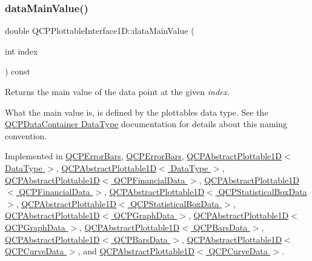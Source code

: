\subsubsection{\texorpdfstring{data\+Main\+Value()}{dataMainValue()}}
{\footnotesize\ttfamily double Q\+C\+P\+Plottable\+Interface1\+D\+::data\+Main\+Value (\begin{DoxyParamCaption}\item[{int}]{index }\end{DoxyParamCaption}) const\hspace{0.3cm}{\ttfamily [pure virtual]}}

Returns the main value of the data point at the given {\itshape index}.

What the main value is, is defined by the plottable\textquotesingle{}s data type. See the \hyperlink{class_q_c_p_data_container_qcpdatacontainer-datatype}{Q\+C\+P\+Data\+Container Data\+Type} documentation for details about this naming convention. 

Implemented in \hyperlink{class_q_c_p_error_bars_a88cd90280366b44c2159774bfb7c473a}{Q\+C\+P\+Error\+Bars}, \hyperlink{class_q_c_p_error_bars_a30170b7bdbfd649e0dd7f79f9a6e62ff}{Q\+C\+P\+Error\+Bars}, \hyperlink{class_q_c_p_abstract_plottable1_d_a0f913bb0889ca7cb574657a078fc8cff}{Q\+C\+P\+Abstract\+Plottable1\+D$<$ Data\+Type $>$}, \hyperlink{class_q_c_p_abstract_plottable1_d_a104b2e36cf4d4ea29f7247887a193842}{Q\+C\+P\+Abstract\+Plottable1\+D$<$ Data\+Type $>$}, \hyperlink{class_q_c_p_abstract_plottable1_d_a0f913bb0889ca7cb574657a078fc8cff}{Q\+C\+P\+Abstract\+Plottable1\+D$<$ Q\+C\+P\+Financial\+Data $>$}, \hyperlink{class_q_c_p_abstract_plottable1_d_a104b2e36cf4d4ea29f7247887a193842}{Q\+C\+P\+Abstract\+Plottable1\+D$<$ Q\+C\+P\+Financial\+Data $>$}, \hyperlink{class_q_c_p_abstract_plottable1_d_a0f913bb0889ca7cb574657a078fc8cff}{Q\+C\+P\+Abstract\+Plottable1\+D$<$ Q\+C\+P\+Statistical\+Box\+Data $>$}, \hyperlink{class_q_c_p_abstract_plottable1_d_a104b2e36cf4d4ea29f7247887a193842}{Q\+C\+P\+Abstract\+Plottable1\+D$<$ Q\+C\+P\+Statistical\+Box\+Data $>$}, \hyperlink{class_q_c_p_abstract_plottable1_d_a0f913bb0889ca7cb574657a078fc8cff}{Q\+C\+P\+Abstract\+Plottable1\+D$<$ Q\+C\+P\+Graph\+Data $>$}, \hyperlink{class_q_c_p_abstract_plottable1_d_a104b2e36cf4d4ea29f7247887a193842}{Q\+C\+P\+Abstract\+Plottable1\+D$<$ Q\+C\+P\+Graph\+Data $>$}, \hyperlink{class_q_c_p_abstract_plottable1_d_a0f913bb0889ca7cb574657a078fc8cff}{Q\+C\+P\+Abstract\+Plottable1\+D$<$ Q\+C\+P\+Bars\+Data $>$}, \hyperlink{class_q_c_p_abstract_plottable1_d_a104b2e36cf4d4ea29f7247887a193842}{Q\+C\+P\+Abstract\+Plottable1\+D$<$ Q\+C\+P\+Bars\+Data $>$}, \hyperlink{class_q_c_p_abstract_plottable1_d_a0f913bb0889ca7cb574657a078fc8cff}{Q\+C\+P\+Abstract\+Plottable1\+D$<$ Q\+C\+P\+Curve\+Data $>$}, and \hyperlink{class_q_c_p_abstract_plottable1_d_a104b2e36cf4d4ea29f7247887a193842}{Q\+C\+P\+Abstract\+Plottable1\+D$<$ Q\+C\+P\+Curve\+Data $>$}.

